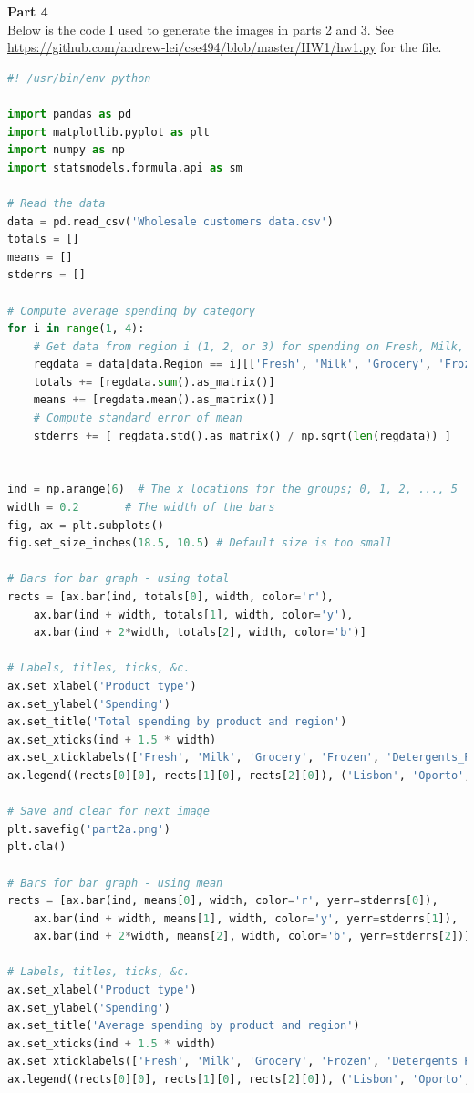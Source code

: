 \documentclass{article}
\begin{document}
	\noindent
	\textbf{Part 4}\\
	Below is the code I used to generate the images in parts 2 and 3. See \url{https://github.com/andrew-lei/cse494/blob/master/HW1/hw1.py} for the file.
	
	\begin{lstlisting}[language=python]
#! /usr/bin/env python

import pandas as pd
import matplotlib.pyplot as plt
import numpy as np
import statsmodels.formula.api as sm

# Read the data
data = pd.read_csv('Wholesale customers data.csv')
totals = []
means = []
stderrs = []

# Compute average spending by category
for i in range(1, 4):
    # Get data from region i (1, 2, or 3) for spending on Fresh, Milk, &c.
    regdata = data[data.Region == i][['Fresh', 'Milk', 'Grocery', 'Frozen', 'Detergents_Paper', 'Delicassen']]
    totals += [regdata.sum().as_matrix()]
    means += [regdata.mean().as_matrix()]
    # Compute standard error of mean
    stderrs += [ regdata.std().as_matrix() / np.sqrt(len(regdata)) ]


ind = np.arange(6)  # The x locations for the groups; 0, 1, 2, ..., 5
width = 0.2       # The width of the bars
fig, ax = plt.subplots()
fig.set_size_inches(18.5, 10.5) # Default size is too small

# Bars for bar graph - using total
rects = [ax.bar(ind, totals[0], width, color='r'),
    ax.bar(ind + width, totals[1], width, color='y'),
    ax.bar(ind + 2*width, totals[2], width, color='b')]

# Labels, titles, ticks, &c.
ax.set_xlabel('Product type')
ax.set_ylabel('Spending')
ax.set_title('Total spending by product and region')
ax.set_xticks(ind + 1.5 * width)
ax.set_xticklabels(['Fresh', 'Milk', 'Grocery', 'Frozen', 'Detergents_Paper', 'Delicassen'])
ax.legend((rects[0][0], rects[1][0], rects[2][0]), ('Lisbon', 'Oporto', 'Other'))

# Save and clear for next image
plt.savefig('part2a.png')
plt.cla()

# Bars for bar graph - using mean
rects = [ax.bar(ind, means[0], width, color='r', yerr=stderrs[0]),
    ax.bar(ind + width, means[1], width, color='y', yerr=stderrs[1]),
    ax.bar(ind + 2*width, means[2], width, color='b', yerr=stderrs[2])]

# Labels, titles, ticks, &c.
ax.set_xlabel('Product type')
ax.set_ylabel('Spending')
ax.set_title('Average spending by product and region')
ax.set_xticks(ind + 1.5 * width)
ax.set_xticklabels(['Fresh', 'Milk', 'Grocery', 'Frozen', 'Detergents_Paper', 'Delicassen'])
ax.legend((rects[0][0], rects[1][0], rects[2][0]), ('Lisbon', 'Oporto', 'Other'))


\end{lstlisting}
\end{document}
